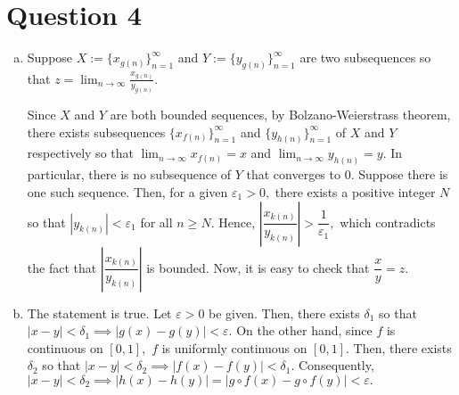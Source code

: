 \documentclass{article}
\begin{document}
\section*{Question 4}
\begin{enumerate}[(a)]
    \item Suppose $X:=\{x_{g(n)}\}^{\infty}_{n=1}$ and $Y:=\{y_{g(n)}\}^{\infty}_{n=1}$ are two subsequences so that $z=\displaystyle\lim_{n\to\infty}\frac{x_{g(n)}}{y_{g(n)}}.$
    
    Since $X$ and $Y$ are both bounded sequences, by Bolzano-Weierstrass theorem, there exists subsequences $\{x_{f(n)}\}^{\infty}_{n=1}$ and $\{y_{h(n)}\}^{\infty}_{n=1}$ of $X$ and $Y$ respectively so that $\displaystyle\lim_{n\to\infty}x_{f(n)}=x$ and $\displaystyle\lim_{n\to\infty}y_{h(n)}=y.$ In particular, there is no subsequence of $Y$ that converges to 0. Suppose there is one such sequence. Then, for a given $\varepsilon_1>0,$ there exists a positive integer $N$ so that $|y_{k(n)}|<\varepsilon_1$ for all $n\geq N.$ Hence, $\left|\dfrac{x_{k(n)}}{y_{k(n)}}\right|>\dfrac{1}{\varepsilon_1},$ which contradicts the fact that $\left|\dfrac{x_{k(n)}}{y_{k(n)}}\right|$ is bounded. Now, it is easy to check that $\dfrac{x}{y}=z.$
    \item The statement is true. Let $\varepsilon>0$ be given. Then, there exists $\delta_1$ so that $|x-y|<\delta_1\implies |g(x)-g(y)|<\varepsilon.$ On the other hand, since $f$ is continuous on $[0,1],$ $f$ is uniformly continuous on $[0,1].$ Then, there exists $\delta_2$ so that $|x-y|<\delta_2\implies |f(x)-f(y)|<\delta_1.$ Consequently, $|x-y|<\delta_2\implies |h(x)-h(y)|=|g\circ f(x)-g\circ f(y)|<\varepsilon.$
\end{enumerate}
\end{document}
